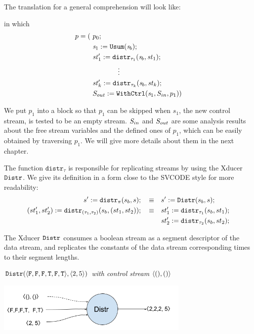 The translation for a general comprehension will look like:\\[3ex]

\def\Distr#1#2#3{\mathtt{distr}_{#3}(#1,#2)}
\def\Pack#1#2#3{\mathtt{pack}_{#3}(#1,#2)}

in which $$ \begin{aligned}
p = ( & \ p_0; \\
    & \ \sdef{\s_1}{\usum(\s_b)}; \\
	& \ \sdef{\st_1'}{\Distr{\s_b}{\st_1}{\tau_1}}; \\
	& \qquad \qquad \vdots \\
	& \ \sdef{\st_k'}{\Distr{\s_b}{\st_k}{\tau_k}}; \\
	& \ \withctrl{\s_1}{p_1}{\Sin}{\Sout} ) \\
\end{aligned}$$	

We put $p_1$ into a \wc block so that $p_1$ can be skipped when $s_1$, the new control stream, is tested to be an empty stream.
$S_{in}$ and $S_{out}$  are some analysis results about the free stream variables and the defined ones of $p_1$, which can be easily obtained by traversing $p_1$. We will give more details about them in the next chapter.

The function $\mathtt{distr}_{\tau}$ is responsible for replicating streams by using the Xducer $\mathtt{Distr}$. 
We give its definition in a form close to the SVCODE style for more readability:
\begin{align*}
	s' := \Distr{s_b}{s}{\pi}; \quad \equiv & \quad s' := \distrf{s_b}{s}; \\
	(st'_1,st'_2)  := \Distr{s_b}{(st_1,st_2)}{(\tau_1,\tau_2)}; \quad \equiv & \quad st_1' := \Distr{s_b}{st_1}{\tau_1}; \\ 
	&\quad st_2' := \Distr{s_b}{st_2}{\tau_2};
\end{align*}

The Xducer $\mathtt{Distr}$ consumes a boolean stream as a segment descriptor of the data stream, and replicates the constants of the data stream corresponding times to their segment lengths.
\begin{example} \emph{$\distrf{\<\F,\F,\F,\T,\F,\T\'>}{\< 2,5 \'>}$ with control stream $\< (),() \'>$}\\
	\begin{center}
		\includegraphics[width=0.7\textwidth]{fig/distrxducer.png}
	\end{center}
\end{example}



